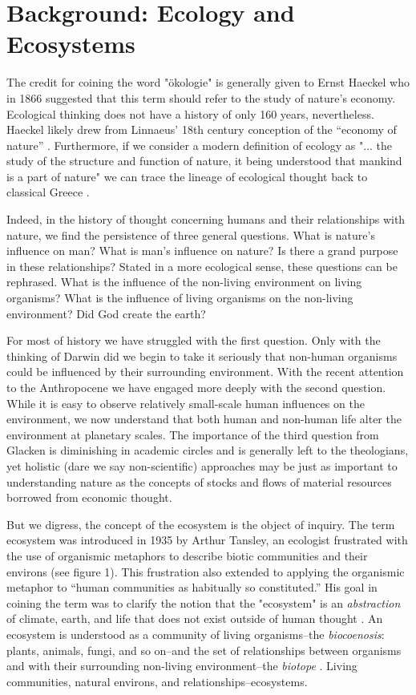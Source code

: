 \section {Background: Ecology and Ecosystems}

The credit for coining the word "ökologie" is generally given to Ernst Haeckel who in 1866 suggested that this term should refer to the study of nature's economy. Ecological thinking does not have a history of only 160 years, nevertheless. Haeckel likely drew from Linnaeus’ 18th century conception of the “economy of nature” \citep{worster_1977}. Furthermore, if we consider a modern definition of ecology as "... the study of the structure and function of nature, it being understood that mankind is a part of nature" we can trace the lineage of ecological thought back to classical Greece \citep[][p. 3]{odum_1953}. 

Indeed, in the history of thought concerning humans and their relationships with nature, we find the persistence of three general questions. What is nature's influence on man? What is man's influence on nature? Is there a grand purpose in these relationships\citep{glacken_1967}? Stated in a more ecological sense, these questions can be rephrased. What is the influence of the non-living environment on living organisms? What is the influence of living organisms on the non-living environment? Did God create the earth?

For most of history we have struggled with the first question. Only with the thinking of Darwin did we begin to take it seriously that non-human organisms could be influenced by their surrounding environment. With the recent attention to the Anthropocene we have engaged more deeply with the second question. While it is easy to observe relatively small-scale human influences on the environment, we now understand that both human and non-human life alter the environment at planetary scales. The importance of the third question from Glacken is diminishing in academic circles and is generally left to the theologians, yet holistic (dare we say non-scientific) approaches may be just as important to understanding nature as the concepts of stocks and flows of material resources borrowed from economic thought. 

But we digress, the concept of the ecosystem is the object of inquiry. The term ecosystem was introduced in 1935 by Arthur Tansley, an ecologist frustrated with the use of organismic metaphors to describe biotic communities and their environs (see figure 1). This frustration also extended to applying the organismic metaphor to “human communities as habitually so constituted.” His goal in coining the term was to clarify the notion that the "ecosystem" is an \textit{abstraction} of climate, earth, and life that does not exist outside of human thought \citep{tansley_1935}. An ecosystem is understood as a community of living organisms--the \textit{biocoenosis}: plants, animals, fungi, and so on--and the set of relationships between organisms and with their surrounding non-living environment--the \textit{biotope} \citep{tansley_1935,odum_1953}. Living communities, natural environs, and relationships--ecosystems. 

